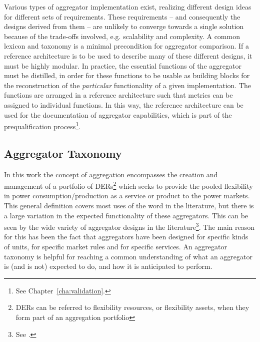 %
%
Various types of aggregator implementation exist, realizing different design ideas for different sets of requirements. These requirements -- and consequently the designs derived from them -- are unlikely to converge towards a single solution because of the trade-offs involved, e.g. scalability and complexity. A common lexicon and taxonomy is a minimal precondition for aggregator comparison.
If a reference architecture is to be used to describe many of these different designs, it must be highly modular. In practice, the essential functions of the aggregator must be distilled, in order for these functions to be usable as building blocks for the reconstruction of the \emph{particular} functionality of a given implementation. 
The functions are arranged in a reference architecture such that metrics can be assigned to individual functions. In this way, the reference architecture can be used for the documentation of aggregator capabilities, which is part of the prequalification process\footnote{See Chapter~\ref{cha:validation}.}.%

\subsection{Aggregator Taxonomy} %
\label{sub:Aggregator Taxonomy}
In this work the concept of aggregation encompasses the creation and management of a portfolio of DERs\footnote{DERs can be referred to flexibility resources, or flexibility assets, when they form part of an aggregation portfolio} which seeks to provide the pooled flexibility in power consumption/production as a service or product to the power markets. This general definition covers most uses of the word in the literature, but there is a large variation in the expected functionality of these aggregators. This can be seen by the wide variety of aggregator designs in the literature\footnote{See \eg\cite{kok2005powermatcher,han2010development,sortomme2011optimal,costanzo2013coordination}.}. The main reason for this has been the fact that aggregators have been designed for specific kinds of units, for specific market rules and for specific services. An aggregator taxonomy is helpful for reaching a common understanding of what an aggregator is (and is not) expected to do, and how it is anticipated to perform.

